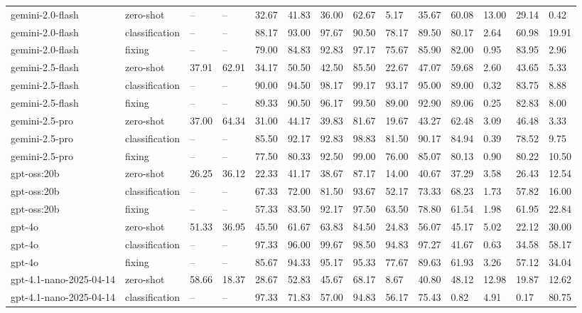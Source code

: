 \begin{table}[!t]
\begin{tabular}{llllllllllllll}
gemini-2.0-flash & zero-shot & -- & -- & 32.67 & 41.83 & 36.00 & 62.67 & 5.17 & 35.67 & 60.08 & 13.00 & 29.14 & 0.42 \\
gemini-2.0-flash & classification & -- & -- & 88.17 & 93.00 & 97.67 & 90.50 & 78.17 & 89.50 & 80.17 & 2.64 & 60.98 & 19.91 \\
gemini-2.0-flash & fixing & -- & -- & 79.00 & 84.83 & 92.83 & 97.17 & 75.67 & 85.90 & 82.00 & 0.95 & 83.95 & 2.96 \\
gemini-2.5-flash & zero-shot & 37.91 & 62.91 & 34.17 & 50.50 & 42.50 & 85.50 & 22.67 & 47.07 & 59.68 & 2.60 & 43.65 & 5.33 \\
gemini-2.5-flash & classification & -- & -- & 90.00 & 94.50 & 98.17 & 99.17 & 93.17 & 95.00 & 89.00 & 0.32 & 83.75 & 8.88 \\
gemini-2.5-flash & fixing & -- & -- & 89.33 & 90.50 & 96.17 & 99.50 & 89.00 & 92.90 & 89.06 & 0.25 & 82.83 & 8.00 \\
gemini-2.5-pro & zero-shot & 37.00 & 64.34 & 31.00 & 44.17 & 39.83 & 81.67 & 19.67 & 43.27 & 62.48 & 3.09 & 46.48 & 3.33 \\
gemini-2.5-pro & classification & -- & -- & 85.50 & 92.17 & 92.83 & 98.83 & 81.50 & 90.17 & 84.94 & 0.39 & 78.52 & 9.75 \\
gemini-2.5-pro & fixing & -- & -- & 77.50 & 80.33 & 92.50 & 99.00 & 76.00 & 85.07 & 80.13 & 0.90 & 80.22 & 10.50 \\
gpt-oss:20b & zero-shot & 26.25 & 36.12 & 22.33 & 41.17 & 38.67 & 87.17 & 14.00 & 40.67 & 37.29 & 3.58 & 26.43 & 12.54 \\
gpt-oss:20b & classification & -- & -- & 67.33 & 72.00 & 81.50 & 93.67 & 52.17 & 73.33 & 68.23 & 1.73 & 57.82 & 16.00 \\
gpt-oss:20b & fixing & -- & -- & 57.33 & 83.50 & 92.17 & 97.50 & 63.50 & 78.80 & 61.54 & 1.98 & 61.95 & 22.84 \\
gpt-4o & zero-shot & 51.33 & 36.95 & 45.50 & 61.67 & 63.83 & 84.50 & 24.83 & 56.07 & 45.17 & 5.02 & 22.12 & 30.00 \\
gpt-4o & classification & -- & -- & 97.33 & 96.00 & 99.67 & 98.50 & 94.83 & 97.27 & 41.67 & 0.63 & 34.58 & 58.17 \\
gpt-4o & fixing & -- & -- & 85.67 & 94.33 & 95.17 & 95.33 & 77.67 & 89.63 & 61.93 & 3.26 & 57.12 & 34.04 \\
gpt-4.1-nano-2025-04-14 & zero-shot & 58.66 & 18.37 & 28.67 & 52.83 & 45.67 & 68.17 & 8.67 & 40.80 & 48.12 & 12.98 & 19.87 & 12.62 \\
gpt-4.1-nano-2025-04-14 & classification & -- & -- & 97.33 & 71.83 & 57.00 & 94.83 & 56.17 & 75.43 & 0.82 & 4.91 & 0.17 & 80.75 \\

\end{tabular}
\end{table}
